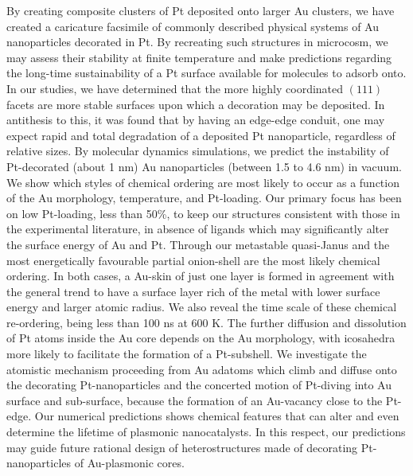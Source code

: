 By creating composite clusters of Pt deposited onto larger Au clusters, we have created a caricature facsimile of commonly described physical systems of Au nanoparticles decorated in Pt. By recreating such structures in microcosm, we may assess their stability at finite temperature and make predictions regarding the long-time sustainability of a Pt surface available for molecules to adsorb onto. In our studies, we have determined that the more highly coordinated $(111)$ facets are more stable surfaces upon which a decoration may be deposited. In antithesis to this, it was found that by having an edge-edge conduit, one may expect rapid and total degradation of a deposited Pt nanoparticle, regardless of relative sizes. By molecular dynamics simulations, we predict the instability of Pt-decorated (about 1 nm) Au nanoparticles (between 1.5 to 4.6 nm) in vacuum. We show which styles of chemical ordering are most likely to occur as a function of the Au morphology, temperature, and Pt-loading. Our primary focus has been on low Pt-loading, less than 50\%, to keep our structures consistent with those in the experimental literature, in absence of ligands which may significantly alter the surface energy of Au and Pt. Through our metastable quasi-Janus and the most energetically favourable partial onion-shell are the most likely chemical ordering. In both cases, a Au-skin of just one layer is formed in agreement with the general trend to have a surface layer rich of the metal with lower surface energy and larger atomic radius. We also reveal  the time scale of these chemical re-ordering, being less than 100 ns at 600 K. The further diffusion and dissolution of Pt atoms inside the Au core depends on the Au morphology, with icosahedra more likely to facilitate the formation of a Pt-subshell. We investigate the atomistic  mechanism proceeding from Au adatoms which climb and diffuse onto the decorating Pt-nanoparticles and the concerted motion of Pt-diving into Au surface and sub-surface, because the formation of an Au-vacancy close to the Pt-edge. Our numerical predictions shows chemical features that can alter and even determine the lifetime of plasmonic nanocatalysts. In this respect, our predictions may guide future rational design of heterostructures made of decorating Pt-nanoparticles of Au-plasmonic cores.


